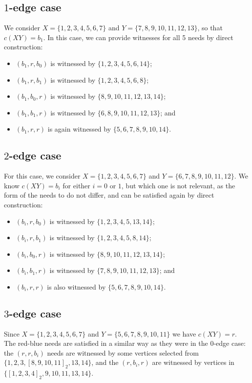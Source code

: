 \documentclass{article}
\theoremstyle{definition}
\begin{document}
\subsection{$1$-edge case}

We consider $X = \{1,2,3,4,5,6,7\}$ and $Y =
\{7,8,9,10,11,12,13\}$, so that $c(XY) = b_{1}$. In this case, we can provide
witnesses for all 5 needs by direct construction:
\begin{itemize}
\item $(b_{1},r,b_{0})$ is witnessed by $\{1,2,3,4,5,6,14\}$;
\item $(b_{1},r,b_{1})$ is witnessed by $\{1,2,3,4,5,6,8\}$;
\item $(b_{1},b_{0},r)$ is witnessed by $\{8,9,10,11,12,13,14\}$;
\item $(b_{1},b_{1},r)$ is witnessed by $\{6,8,9,10,11,12,13\}$; and
\item $(b_{1},r,r)$ is again witnessed by $\{5,6,7,8,9,10,14\}$.
\end{itemize}

\subsection{$2$-edge case}

For this case, we consider $X = \{1,2,3,4,5,6,7\}$ and $Y =
\{6,7,8,9,10,11,12\}$. We know $c(XY) = b_{i}$ for either $i=0$ or $1$, but
which one is not relevant, as the form of the needs to do not differ, and can
be satisfied again by direct construction:
\begin{itemize}
\item $(b_{i},r,b_{0})$ is witnessed by $\{1,2,3,4,5,13,14\}$;
\item $(b_{i},r,b_{1})$ is witnessed by $\{1,2,3,4,5,8,14\}$;
\item $(b_{i},b_{0},r)$ is witnessed by $\{8,9,10,11,12,13,14\}$;
\item $(b_{i},b_{1},r)$ is witnessed by $\{7,8,9,10,11,12,13\}$; and
\item $(b_{i},r,r)$ is also witnessed by $\{5,6,7,8,9,10,14\}$.
\end{itemize}

\subsection{$3$-edge case}

Since $X = \{1,2,3,4,5,6,7\}$ and $Y = \{5,6,7,8,9,10,11\}$ we have $c(XY) =
r$.  The red-blue needs are satisfied in a similar way as they were in the
$0$-edge case: the $(r,r,b_{i})$ needs are witnessed by some vertices selected
from $\{1,2,3,[8,9,10,11]_{2},13,14\}$, and the $(r,b_{i},r)$ are witnessed by
vertices in $\{[1,2,3,4]_{2},9,10,11,13,14\}$.
\end{document}
